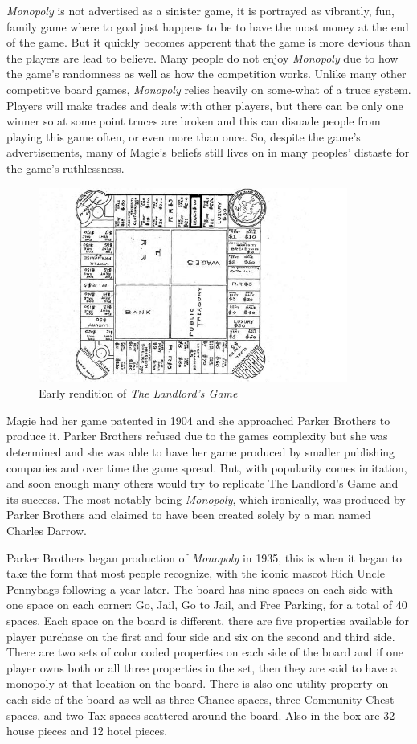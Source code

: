 \documentclass{article}
\begin{document}
\textit{Monopoly} is not advertised as a sinister game, it is portrayed as vibrantly, fun, family game where to goal just happens to be to have the most money at the end of the game.  But it quickly becomes apperent that the game is more devious than the players are lead to believe.  Many people do not enjoy \textit{Monopoly} due to how the game's randomness as well as how the competition works.  Unlike many other competitve board games, \textit{Monopoly} relies heavily on some-what of a truce system.  Players will make trades and deals with other players, but there can be only one winner so at some point truces are broken and this can disuade people from playing this game often, or even more than once.  So, despite the game's advertisements, many of Magie's beliefs still lives on in many peoples' distaste for the game's ruthlessness.


\begin{figure}
    \centering
    \includegraphics[width=4.0in]{landlordsgame}
    \caption{Early rendition of \textit{The Landlord's Game}}
    \label{landlordsgame_image}
\end{figure}


Magie had her game patented in 1904 and she approached Parker Brothers to produce it.  Parker Brothers refused due to the games complexity but she was determined and she was able to have her game produced by smaller publishing companies and over time the game spread. But, with popularity comes imitation, and soon enough many others would try to replicate The Landlord’s Game and its success.  The most notably being \textit{Monopoly}, which ironically, was produced by Parker Brothers and claimed to have been created solely by a man named Charles Darrow.

Parker Brothers began production of \textit{Monopoly} in 1935, this is when it began to take the form that most people recognize, with the iconic mascot Rich Uncle Pennybags following a year later.  The board has nine spaces on each side with one space on each corner: Go, Jail, Go to Jail, and Free Parking, for a total of 40 spaces.  Each space on the board is different, there are five properties available for player purchase on the first and four side and six on the second and third side.  There are two sets of color coded properties on each side of the board and if one player owns both or all three properties in the set, then they are said to have a monopoly at that location on the board.  There is also one utility property on each side of the board as well as three Chance spaces, three Community Chest spaces, and two Tax spaces scattered around the board.  Also in the box are 32 house pieces and 12 hotel pieces.
\end{document}
